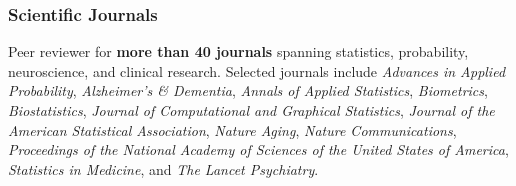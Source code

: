 \documentclass[12pt,letterpaper]{article}
\begin{document}
	\subsubsection*{Scientific Journals}
	\noindent Peer reviewer for \textbf{more than 40 journals} 
	spanning statistics, probability, neuroscience, and clinical 
	research. Selected journals include \emph{Advances in Applied 
	Probability}, \emph{Alzheimer's \& Dementia}, \emph{Annals of 
	Applied Statistics}, \emph{Biometrics}, \emph{Biostatistics}, 
	\emph{Journal of Computational and Graphical Statistics}, 
	\emph{Journal of the American Statistical Association}, 
	\emph{Nature Aging}, \emph{Nature Communications}, 
	\emph{Proceedings of the National Academy of Sciences of the 
	United States of America}, \emph{Statistics in Medicine}, and 
	\emph{The Lancet Psychiatry}.\par
\end{document}

